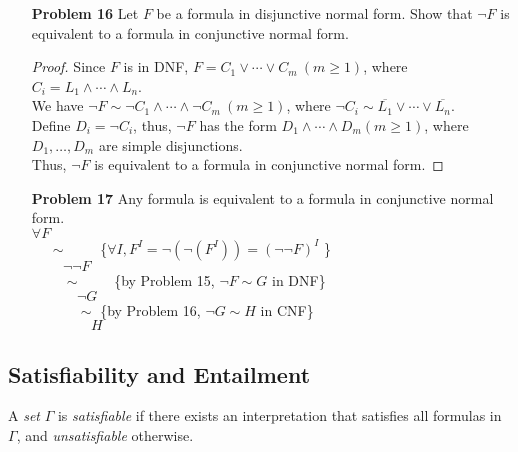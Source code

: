 \begin{enumerate}

\item[\textbf{Problem 16}] Let $F$ be a formula in disjunctive normal form. Show that $\neg F$ is equivalent to a formula in conjunctive normal form. 
\begin{proof}
Since $F$ is in DNF, $F = C_1 \vee \cdots \vee C_m ~(m \geq 1)$, where $C_i = L_1 \wedge \cdots \wedge L_n$. \\
We have $\neg F \sim \neg C_1 \wedge \cdots \wedge \neg C_m ~(m \geq 1)$, where $\neg C_i \sim \overline{L_1} \vee \cdots \vee \overline{L_n}$. \\
Define $D_i = \neg C_i$, thus, $\neg F$ has the form $D_1 \wedge \cdots \wedge D_m (m \geq 1)$, where $D_1, \ldots, D_m$ are simple disjunctions. \\
Thus, $\neg F$ is equivalent to a formula in conjunctive normal form. 
\end{proof}

\item[\textbf{Problem 17}] Any formula is equivalent to a formula in conjunctive normal form.   \\
$\forall F $ \\
$~\quad \sim \qquad$  \{$\forall I, F^I = \neg (\neg (F^I)) = (\neg \neg F)^I$ \}\\
    $~\qquad \neg \neg F$  \\
$~\qquad \sim \qquad$   \{by Problem 15, $\neg F \sim G $ in DNF\}  \\ 
    $~\qquad \quad \neg G$  \\
 $~\qquad \quad \sim$   \{by Problem 16, $\neg G \sim H$ in CNF\}  \\ 
    $~\qquad \qquad H$ 
\end{enumerate}

\subsection{Satisfiability and Entailment}
A \textit{set} $\Gamma$ is \textit{satisfiable} if there exists an interpretation that satisfies all formulas in $\Gamma$, and \textit{unsatisfiable} otherwise. 

